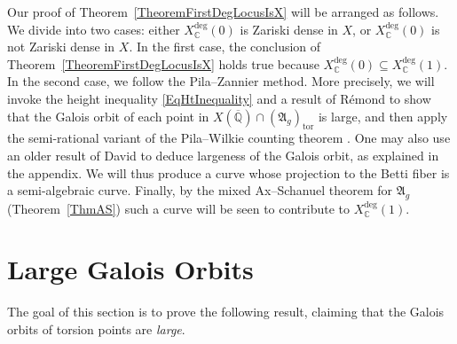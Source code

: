 \documentclass[12pt,oneside]{amsart}
\numberwithin{maincounter}{section}
\numberwithin{equation}{section}
\def\CC{\mathbb{C}}
\def\QQ{\mathbb{Q}}
\newcommand{\IC}{{\CC}}
\newcommand{\IQbar}{{\overline{\QQ}}}
\begin{document}
Our proof of Theorem~\ref{TheoremFirstDegLocusIsX} will be arranged as
follows. We divide into two cases: either $X_\IC^{\mathrm{deg}}(0)$ is
Zariski dense in $X$, or $X_\IC^{\mathrm{deg}}(0)$ is not Zariski
dense in $X$. In the first case, the conclusion of
Theorem~\ref{TheoremFirstDegLocusIsX} holds true because
$X_\IC^{\mathrm{deg}}(0) \subseteq X_\IC^{\mathrm{deg}}(1)$. In the second
case, we follow the Pila--Zannier method. More precisely, we will
invoke the height inequality \eqref{EqHtInequality} and a result of 
R\'{e}mond \cite[Proposition~2.9]{RemondGaloisBound} to show that the Galois orbit
of each point in $X(\IQbar) \cap (\mathfrak{A}_g)_{\mathrm{tor}}$ is large,
and then apply the semi-rational variant of the Pila--Wilkie counting
theorem \cite[Corollary~7.2]{HabeggerPilaENS}.
One may also use an older result of David
\cite{DavidMinHaut} to deduce largeness of the Galois orbit, as
explained in the appendix.
We will thus
produce a curve whose projection to the Betti fiber is a
semi-algebraic curve. Finally, by the mixed Ax--Schanuel theorem for
$\mathfrak{A}_g$ (Theorem~\ref{ThmAS}) such a curve will be seen to contribute to
$X_\IC^{\mathrm{deg}}(1)$.








\section{Large Galois Orbits}
\label{SectionLGO}

The goal of this section is to prove the following result, claiming
that the Galois orbits of torsion points are \textit{large}.
\end{document}
